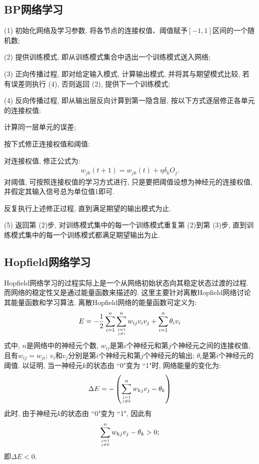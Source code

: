 \subsection{BP网络学习}

 (1) 初始化网络及学习参数, 将各节点的连接权值、阈值赋予$[-1, 1]$区间的一个随机数;

 (2) 提供训练模式, 即从训练模式集合中选出一个训练模式送入网络;

 (3) 正向传播过程, 即对给定输入模式, 计算输出模式, 并将其与期望模式比较, 若有误差则执行 (4), 否则返回 (2), 提供下一个训练模式;

 (4) 反向传播过程, 即从输出层反向计算到第一隐含层, 按以下方式逐层修正各单元的连接权值:

    \quad {} 计算同一层单元的误差;

    \quad {} 按下式修正连接权值和阈值:

    \quad 对连接权值, 修正公式为:
        \begin{align}
            w_{j k} (t+1)=w_{j k} (t)+\eta \delta_{k} O_{j}.
        \end{align}
    对阈值, 可按照连接权值的学习方式进行, 只是要把阈值设想为神经元的连接权值, 并假定其输入信号总为单位值1即可.

    反复执行上述修正过程, 直到满足期望的输出模式为止.

 (5) 返回第 (2)步, 对训练模式集中的每一个训练模式重复第 (2)到第 (3)步, 直到训练模式集中的每一个训练模式都满足期望输出为止.
\subsection{Hopfield网络学习}
Hopfield网络学习的过程实际上是一个从网络初始状态向其稳定状态过渡的过程. 而网络的稳定性又是通过能量函数来描述的. 这里主要针对离散Hopfield网络讨论其能量函数和学习算法.
离散Hopfield网络的能量函数可定义为:
\begin{align}
    E=-\frac{1}{2} \sum_{i=1}^{n} \sum_{j=1 \atop j \neq i}^{n} w_{i j} v_{i} v_{j}+\sum_{i=1}^{n} \theta_{i} v_{i}
\end{align}
式中, $n$是网络中的神经元个数, $w_{ij}$是第$i$个神经元和第$j$个神经元之间的连接权值, 且有$w_{ij}=w_{ji}$;  $v_i$和$v_j$分别是第$i$个神经元和第$j$个神经元的输出; $\theta_i$是第$i$个神经元的阈值.
以证明, 当一神经元$k$的状态由 ``0"变为 ``1"时, 网络能量的变化为:
\begin{align}
    \Delta E=-\left (\sum_{j=1 \atop j \neq k}^{n} w_{k j} v_{j}-\theta_{k}\right)
\end{align}
此时, 由于神经元$k$的状态由 ``0"变为 ``1", 因此有
\begin{align}
    \sum_{j=1 \atop j \neq k}^{n} w_{k j} v_{j}-\theta_{k}>0;
\end{align}
即$\Delta E<0$.

